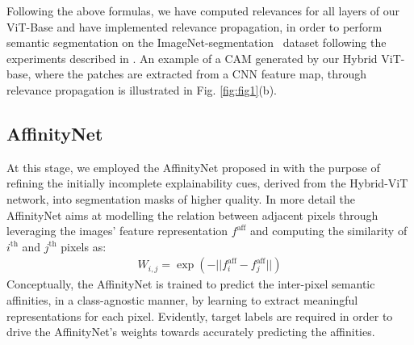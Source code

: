 \documentclass{article}
\begin{document}
Following the above formulas, we have computed relevances for all layers of our ViT-Base and have implemented relevance propagation, in order to perform semantic segmentation on the ImageNet-segmentation~\cite{imagenet-seg} dataset following the experiments described in \cite{mainpaper}. An example of a CAM generated by our Hybrid ViT-base, where the patches are extracted from a CNN feature map, through relevance propagation is illustrated in Fig. \ref{fig:fig1}(b).

\subsection{AffinityNet}
\label{sub:3.3}
At this stage, we employed the AffinityNet proposed in \cite{ahn2018learning} with the purpose of refining the initially incomplete explainability cues, derived from the Hybrid-ViT network, into segmentation masks of higher quality. In more detail the AffinityNet aims at modelling the relation between adjacent pixels through leveraging the images' feature representation $f^\text{aff}$ and computing the similarity of $i^\text{th}$ and $j^\text{th}$ pixels as:
\begin{align*}
W_{i,j}=\exp\left(-||{f_i^\text{aff}-f_j^\text{aff}}||\right)
\end{align*}
Conceptually, the AffinityNet is trained to predict the inter-pixel semantic affinities, in a class-agnostic manner, by learning to extract meaningful representations for each pixel. Evidently, target labels are required in order to drive the AffinityNet's weights towards accurately predicting the affinities.
\end{document}
